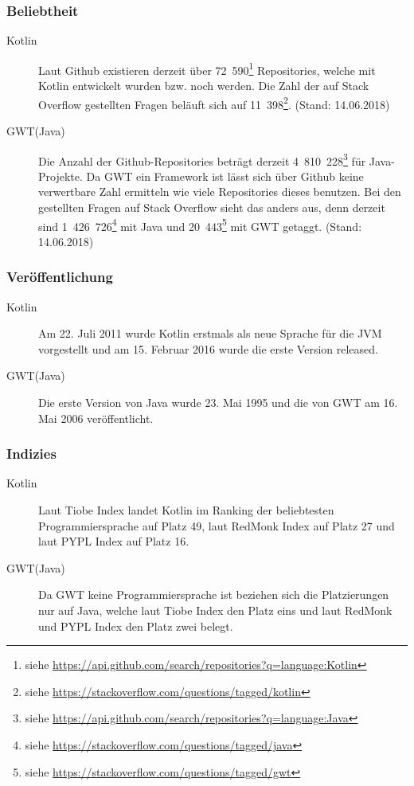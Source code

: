 \subsubsection{Beliebtheit}
\begin{description}
	\item[Kotlin] Laut Github existieren derzeit über 72~590\footnote{siehe \url{https://api.github.com/search/repositories?q=language:Kotlin}} Repositories, welche mit Kotlin entwickelt wurden bzw. noch werden. Die Zahl der auf Stack Overflow gestellten Fragen beläuft sich auf 11~398\footnote{siehe \url{https://stackoverflow.com/questions/tagged/kotlin}}. (Stand: 14.06.2018)
	\item[GWT(Java)] Die Anzahl der Github-Repositories beträgt derzeit 4~810~228\footnote{siehe \url{https://api.github.com/search/repositories?q=language:Java}} für Java-Projekte. Da \gls{GWT} ein Framework ist lässt sich über Github keine verwertbare Zahl ermitteln wie viele Repositories dieses benutzen. Bei den gestellten Fragen auf Stack Overflow sieht das anders aus, denn derzeit sind 1~426~726\footnote{siehe \url{https://stackoverflow.com/questions/tagged/java}} mit Java und 20~443\footnote{siehe \url{https://stackoverflow.com/questions/tagged/gwt}} mit \gls{GWT} getaggt. (Stand: 14.06.2018)
\end{description}

\subsubsection{Veröffentlichung}
\begin{description}
	\item[Kotlin] Am 22. Juli 2011 wurde Kotlin erstmals als neue Sprache für die \gls{JVM} vorgestellt und am 15. Februar 2016 wurde die erste Version released. \cite{kotlinNewForJVM, kotlinRelease}
	\item[GWT(Java)] Die erste Version von Java wurde 23. Mai 1995 und die von \gls{GWT} am 16. Mai 2006 veröffentlicht. \cite{javaRelease, gwtRelease}
\end{description}

\subsubsection{Indizies}
\begin{description}
	\item[Kotlin] Laut Tiobe Index landet Kotlin im Ranking der beliebtesten Programmiersprache auf Platz 49, laut RedMonk Index auf Platz 27 und laut PYPL Index auf Platz 16. \cite{tiobeIndex, redMonkIndex, pyplIndex}
	\item[GWT(Java)] Da \gls{GWT} keine Programmiersprache ist beziehen sich die Platzierungen nur auf Java, welche laut Tiobe Index den Platz eins und laut RedMonk und PYPL Index den Platz zwei belegt. \cite{tiobeIndex, redMonkIndex, pyplIndex}
\end{description}


